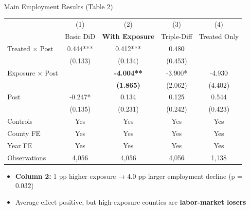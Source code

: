 \documentclass[aspectratio=169]{beamer}
\begin{document}
\begin{frame}{Main Employment Results (Table 2)}
  \begin{table}
  \tiny
  \centering
  \begin{tabular}{lcccc}
  \toprule
   & (1) & (2) & (3) & (4) \\
   & Basic DiD & \textbf{With Exposure} & Triple-Diff & Treated Only \\
  \midrule
  Treated $\times$ Post & 0.444*** & 0.412*** & 0.480 & \\
   & (0.133) & (0.134) & (0.453) & \\
  Exposure $\times$ Post & & \textbf{-4.004**} & -3.900* & -4.930 \\
   & & \textbf{(1.865)} & (2.062) & (4.402) \\
  Post & -0.247* & 0.134 & 0.125 & 0.544 \\
   & (0.135) & (0.231) & (0.242) & (0.423) \\
  \midrule
  Controls & Yes & Yes & Yes & Yes \\
  County FE & Yes & Yes & Yes & Yes \\
  Year FE & Yes & Yes & Yes & Yes \\
  Observations & 4,056 & 4,056 & 4,056 & 1,138 \\
  \bottomrule
  \end{tabular}
  \end{table}
  \vspace{0.2cm}
  \begin{itemize}
    \item \textbf{Column 2:} 1 pp higher exposure → 4.0 pp larger employment decline (p = 0.032)
    \item Average effect positive, but high-exposure counties are \textbf{labor-market losers}
  \end{itemize}
\end{frame}
\end{document}
